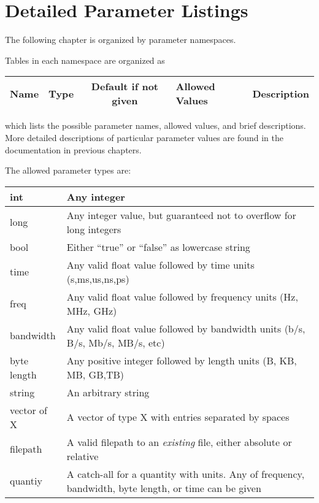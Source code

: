
\newcommand{\openTable}[1]{\begin{tabular}{| c | c | c | p{3cm} | p{#1} |}}

\chapter{Detailed Parameter Listings}
\label{chapter:parameters}
The following chapter is organized by parameter namespaces.

Tables in each namespace are organized as
\def\arraystretch{1.5}%

\openTable{6.5cm}
\hline
Name & Type & Default if not given & Allowed \newline Values & Description \\
\hline
\end{tabular}

which lists the possible parameter names, allowed values, and brief descriptions.
More detailed descriptions of particular parameter values are found in the documentation in previous chapters.

The allowed parameter types are:

\begin{tabular}{| l | l |}
\hline
int & Any integer \\
\hline
long & Any integer value, but guaranteed not to overflow for long integers \\
\hline
bool & Either ``true'' or ``false'' as lowercase string \\
\hline
time & Any valid float value followed by time units (s,ms,us,ns,ps) \\
\hline
freq & Any valid float value followed by frequency units (Hz, MHz, GHz) \\
\hline
bandwidth & Any valid float value followed by bandwidth units (b/s, B/s, Mb/s, MB/s, etc) \\
\hline
byte length & Any positive integer followed by length units (B, KB, MB, GB,TB) \\
\hline
string & An arbitrary string \\
\hline
vector of X & A vector of type X with entries separated by spaces \\
\hline
filepath & A valid filepath to an \emph{existing} file, either absolute or relative \\
\hline
quantiy & A catch-all for a quantity with units. Any of frequency, bandwidth, byte length, or time can be given \\
\hline
\end{tabular}
